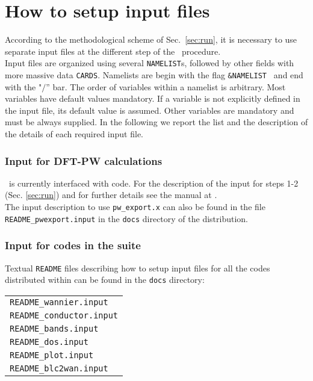 
\thispagestyle{empty}
\section{How to setup input files}\label{sec:input}

\noindent According to the methodological scheme of Sec.~\ref{sec:run},
it is necessary to use separate input files at
the different step of the \WANT\ procedure.\\

\noindent Input files are organized using several {\tt NAMELIST}s,
followed by other fields with more massive data {\tt CARDS}. Namelists are
begin with the flag {\tt \&NAMELIST } and end with the
"$/$'' bar. The order of variables within a namelist is
arbitrary. Most variables have default values mandatory.
If a variable is not explicitly defined in the input file,
its default value is assumed. Other variables are mandatory and must be
always supplied.
In the following we report the list and the description
of the details of each required input file.

\subsubsection{Input for DFT-PW calculations}
%
\noindent \WANT\ is currently interfaced with \PWSCF code. For the
description of the input for steps 1-2 (Sec. \ref{sec:run})
and for further details see the \PWSCF manual at \PWSCFURL .\\
The input description to use {\tt pw\_export.x} can also be found 
in the file {\tt README\_pwexport.input} in the {\tt docs} directory of
the \WANT{} distribution.

%
\subsubsection{Input for codes in the \WANT{} suite}
%
\noindent
Textual {\tt README} files describing how to setup input files
for all the codes distributed within \WANT{} can be found in the 
{\tt docs} directory: \\

\begin{tabular}{@{\hspace{10pt}}l}
    {\tt README\_wannier.input}  \\
    {\tt README\_conductor.input} \\
    {\tt README\_bands.input} \\
    {\tt README\_dos.input} \\
    {\tt README\_plot.input} \\
    {\tt README\_blc2wan.input}  \\
\end{tabular}

